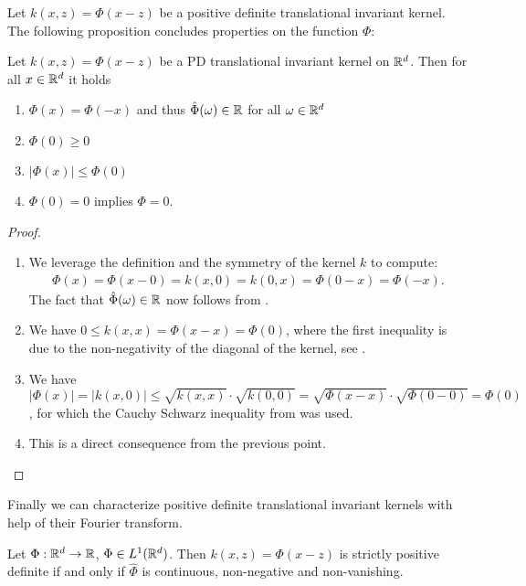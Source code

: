 Let $k(x, z) = \Phi(x-z)$ be a positive definite translational invariant kernel.
The following proposition concludes properties on the function $\Phi$:

\begin{prop}
Let $k(x, z) = \Phi(x-z)$ be a PD translational invariant kernel on $\mathbb{R}^d$.
Then for all $x \in \mathbb{R}^d$ it holds
\begin{enumerate}
\item $\Phi(x) = \Phi(-x)$ and thus $\hat{\Phi}(\omega) \in \mathbb{R}$ for all $\omega \in \mathbb{R}^d$
\item $\Phi(0) \geq 0$
\item $|\Phi(x)| \leq \Phi(0)$
\item $\Phi(0) = 0$ implies $\Phi = 0$.
\end{enumerate}
\end{prop}


\begin{proof}
\begin{enumerate}
\item We leverage the definition and the symmetry of the kernel $k$ to compute:
\begin{align*}
\Phi(x) = \Phi(x - 0) = k(x, 0) = k(0, x) = \Phi(0 - x) = \Phi(-x).
\end{align*}
The fact that $\hat{\Phi}(\omega) \in \mathbb{R}$ now follows from .
\item We have $0 \leq k(x, x) = \Phi(x-x) = \Phi(0)$, where the first inequality is due to the non-negativity of the diagonal of the kernel, see .
\item We have $|\Phi(x)| = |k(x, 0)| \leq \sqrt{k(x, x)} \cdot \sqrt{k(0, 0)} = \sqrt{\Phi(x-x)} \cdot \sqrt{\Phi(0-0)} = \Phi(0)$,
for which the Cauchy Schwarz inequality from  was used.
\item This is a direct consequence from the previous point.
\end{enumerate}
\end{proof}

Finally we can characterize positive definite translational invariant kernels with help of their Fourier transform.

\begin{thm}
Let $\Phi: \mathbb{R}^d \rightarrow \mathbb{R}$, $\Phi \in L^1(\mathbb{R}^d)$.
Then $k(x, z) = \Phi(x - z)$ is strictly positive definite if and only if $\hat{\Phi}$ is continuous, non-negative and non-vanishing.
\end{thm}

